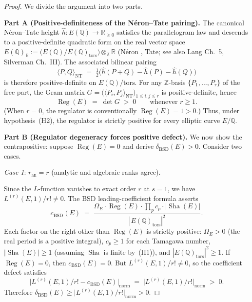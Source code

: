 \documentclass[11pt]{article}
\theoremstyle{definition}
\DeclareMathOperator{\Reg}{Reg}
\DeclareMathOperator{\Sha}{Sha}
\begin{document}
\begin{proof}
We divide the argument into two parts.

\medskip
\noindent\textbf{Part A (Positive-definiteness of the N\'eron--Tate pairing).}
The canonical N\'eron--Tate height $\hat{h} : E(\mathbb{Q}) \to \mathbb{R}_{\geq 0}$
satisfies the parallelogram law and descends to a positive-definite
quadratic form on the real vector space
$E(\mathbb{Q})_{\mathbb{R}} := \bigl(E(\mathbb{Q}) / E(\mathbb{Q})_{\mathrm{tors}}\bigr)
\otimes_{\mathbb{Z}} \mathbb{R}$
(N\'eron \cite{Neron}, Tate; see also Lang \cite{Lang} Ch.~5,
Silverman \cite{SilvAdv} Ch.~III).
The associated bilinear pairing
\[
  \langle P, Q \rangle_{\mathrm{NT}}
  \;=\; \tfrac{1}{2}\bigl(\hat{h}(P+Q) - \hat{h}(P) - \hat{h}(Q)\bigr)
\]
is therefore positive-definite on $E(\mathbb{Q})/\mathrm{tors}$.
For any $\mathbb{Z}$-basis $\{P_1, \ldots, P_r\}$ of the free part, the
Gram matrix $G = \bigl(\langle P_i, P_j \rangle_{\mathrm{NT}}\bigr)_{1 \leq i,j \leq r}$
is positive-definite, hence
\[
  \Reg(E) \;=\; \det G \;>\; 0 \qquad \text{whenever } r \geq 1.
\]
(When $r = 0$, the regulator is conventionally $\Reg(E) = 1 > 0$.)
Thus, under hypothesis~(H2), the regulator is strictly positive for every
elliptic curve $E/\mathbb{Q}$.

\medskip
\noindent\textbf{Part B (Regulator degeneracy forces positive defect).}
We now show the contrapositive: suppose $\Reg(E) = 0$ and derive
$\delta_{\mathrm{BSD}}(E) > 0$.  Consider two cases.

\smallskip
\noindent\emph{Case 1}: $r_{\mathrm{an}} = r$ (analytic and algebraic ranks agree).
\par\noindent
Since the $L$-function vanishes to exact order $r$ at $s = 1$, we have
$L^{(r)}(E,1) / r! \neq 0$.
The BSD leading-coefficient formula asserts
\[
  c_{\mathrm{BSD}}(E)
  \;=\;
  \frac{\Omega_E \cdot \Reg(E) \cdot \prod_{p} c_p \cdot |\Sha(E)|}
       {|E(\mathbb{Q})_{\mathrm{tors}}|^2}.
\]
Each factor on the right other than $\Reg(E)$ is strictly positive:
$\Omega_E > 0$ (the real period is a positive integral),
$c_p \geq 1$ for each Tamagawa number,
$|\Sha(E)| \geq 1$ (assuming $\Sha$ is finite by~(H1)),
and $|E(\mathbb{Q})_{\mathrm{tors}}|^2 \geq 1$.
If $\Reg(E) = 0$, then $c_{\mathrm{BSD}}(E) = 0$.
But $L^{(r)}(E,1)/r! \neq 0$, so the coefficient defect satisfies
\[
  \bigl| L^{(r)}(E,1)/r! - c_{\mathrm{BSD}}(E) \bigr|_{\mathrm{norm}}
  \;=\;
  \bigl| L^{(r)}(E,1)/r! \bigr|_{\mathrm{norm}}
  \;>\; 0.
\]
Therefore $\delta_{\mathrm{BSD}}(E) \geq \bigl| L^{(r)}(E,1)/r! \bigr|_{\mathrm{norm}} > 0$.


\end{proof}
\end{document}
